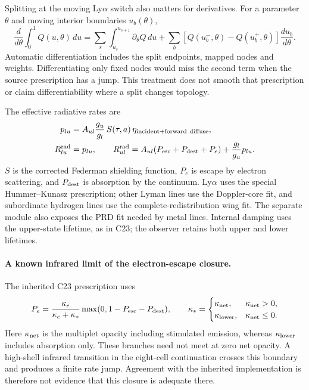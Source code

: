 \documentclass[10pt,a4paper]{article}
\begin{document}
Splitting at the moving Ly$\alpha$ switch also matters for derivatives.
For a parameter $\theta$ and moving interior boundaries $u_b(\theta)$,
\begin{equation}
 \frac{d}{d\theta}\int_0^1 Q(u,\theta)\,du
 =\sum_s\int_{u_s}^{u_{s+1}}\partial_\theta Q\,du
  +\sum_b\left[Q(u_b^-,\theta)-Q(u_b^+,\theta)\right]
                \frac{du_b}{d\theta}.
 \label{eq:moving_quadrature_boundary}
\end{equation}
Automatic differentiation includes the split endpoints, mapped nodes and
weights. Differentiating only fixed nodes would miss the second term when
the source prescription has a jump. This treatment does not smooth that
prescription or claim differentiability where a split changes topology.

The effective radiative rates are
\begin{align}
 p_{lu}&=A_{ul}\frac{g_u}{g_l}\,S(\tau,a)\,
                 \eta_{\rm incident+forward\ diffuse},\\
 R_{lu}^{\rm rad}&=p_{lu},\qquad
 R_{ul}^{\rm rad}=A_{ul}(P_{\rm esc}+P_{\rm dest}+P_e)
                         +\frac{g_l}{g_u}p_{lu}.
 \label{eq:rates}
\end{align}
$S$ is the corrected Federman shielding function, $P_e$ is escape by electron
scattering, and $P_{\rm dest}$ is absorption by the continuum. Ly$\alpha$ uses
the special Hummer--Kunasz prescription; other Lyman lines use the Doppler-core
fit, and subordinate hydrogen lines use the complete-redistribution wing fit.
The separate  module also exposes the PRD fit
needed by metal lines. Internal damping uses the upper-state lifetime, as in
C23; the observer retains both upper and lower lifetimes.

\paragraph{A known infrared limit of the electron-escape closure.}
The inherited C23 prescription uses
\begin{equation}
 P_e=\frac{\kappa_e}{\kappa_e+\kappa_*}
           \max(0,1-P_{\rm esc}-P_{\rm dest}),\qquad
 \kappa_*=\begin{cases}
 \kappa_{\rm net},&\kappa_{\rm net}>0,\\
 \kappa_{\rm lower},&\kappa_{\rm net}\leq0.
 \end{cases}
 \label{eq:electron_escape_branch}
\end{equation}
Here $\kappa_{\rm net}$ is the multiplet opacity including stimulated
emission, whereas $\kappa_{\rm lower}$ includes absorption only. These
branches need not meet at zero net opacity. A high-shell infrared transition
in the eight-cell continuation crosses this boundary and produces a finite
rate jump. Agreement with the inherited implementation is therefore not
evidence that this closure is adequate there.
\end{document}
